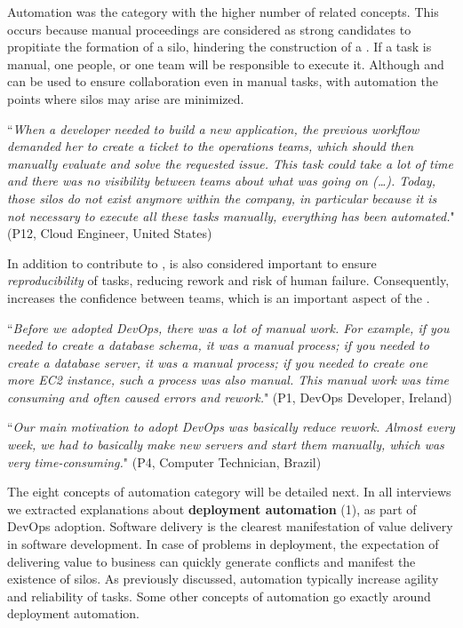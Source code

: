Automation was the category with the higher number of related concepts. This
occurs because manual proceedings are considered as strong candidates to
propitiate the formation of a silo, hindering the construction
of a . If a task is manual, one people, or one
team will be responsible to execute it. Although  and  can
be used to ensure collaboration even in manual tasks, with automation the
points where silos may arise are minimized.

\begin{mq}
``\emph{When a developer needed to build a new application, the previous workflow demanded her
to create a ticket to the operations teams, which should then manually evaluate and solve
the requested issue. This task could take a lot of time and there was no
visibility between teams about what was going on (\ldots). Today, those silos do not exist
anymore within the company, in particular because it is not necessary to execute all these tasks manually,
everything has been automated.}" (P12, Cloud Engineer, United States)
\end{mq}

In addition to contribute to ,  is also considered
important to ensure \emph{reproducibility} of tasks, reducing rework and risk of
human failure. Consequently,  increases the confidence
between teams, which is an important aspect of the .

\begin{mq}
``\emph{Before we adopted DevOps, there was a lot of manual work. For example, if you
needed to create a database schema, it was a manual process; if you needed to create a
database server, it was a manual process; if you needed to create one more EC2 instance,
such a process was also manual. This manual work was time consuming and often caused errors and
rework.}" (P1, DevOps Developer, Ireland)
\end{mq}

\begin{mq}
``\emph{Our main motivation to adopt DevOps was basically reduce rework. Almost every
week, we had to basically make new servers and start them manually, which was
very time-consuming.}" (P4, Computer Technician, Brazil)
\end{mq}

The eight concepts of automation category will be detailed next.
In all interviews we extracted explanations about \textbf{deployment
automation} (1), as part of DevOps adoption. Software delivery is the clearest
manifestation of value delivery in software development. In case of problems
in deployment, the expectation of delivering value to business can quickly
generate conflicts and manifest the existence of silos. As previously discussed,
automation typically increase agility and reliability of tasks. Some other
concepts of automation go exactly around deployment automation.

